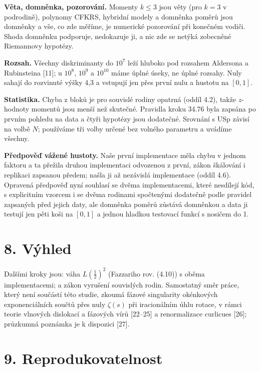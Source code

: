 \documentclass[
  10pt,
]{article}
\begin{document}
\textbf{Věta, domněnka, pozorování.} Momenty \(k \le 3\) jsou věty (pro
\(k = 3\) v podrodině), polynomy CFKRS, hybridní modely a domněnka
poměrů jsou domněnky a vše, co zde měříme, je numerické pozorování při
konečném vodiči. Shoda domněnku podporuje, nedokazuje ji, a nic zde se
netýká zobecněné Riemannovy hypotézy.

\textbf{Rozsah.} Všechny diskriminanty do \(10^7\) leží hluboko pod
rozsahem Aldersona a Rubinsteina {[}11{]}; u \(10^8\), \(10^9\) a
\(10^{10}\) máme úplné úseky, ne úplné rozsahy. Nuly sahají do rozvinuté
výšky 4,3 a vstupují jen přes první nulu a hustotu na \([0, 1]\).

\textbf{Statistika.} Chyba z bloků je pro souvislé rodiny opatrná (oddíl
4.2), takže \(z\)-hodnoty momentů jsou menší než skutečné. Pravidla
kroku 34.76 byla zapsána po prvním pohledu na data a čtyři hypotézy jsou
dodatečné. Srovnání s USp závisí na volbě \(N\); používáme tři volby
určené bez volného parametru a uvádíme všechny.

\textbf{Předpověď vážené hustoty.} Naše první implementace měla chybu v
jednom faktoru a ta přežila druhou implementaci odvozenou z první, zákon
škálování i replikaci zapsanou předem; našla ji až nezávislá
implementace (oddíl 4.6). Opravená předpověď nyní souhlasí se dvěma
implementacemi, které nesdílejí kód, s explicitním vzorcem i se dvěma
rodinami spočtenými dodatečně podle pravidel zapsaných před jejich daty,
ale domněnka poměrů zůstává domněnkou a data ji testují jen pěti koši na
\([0, 1]\) a jednou hladkou testovací funkcí s nosičem do 1.

\hypertarget{vuxfdhled}{%
\section{8. Výhled}\label{vuxfdhled}}

Dalšími kroky jsou: váha \(L(\tfrac12)^2\) (Fazzariho rov. (4.10)) s
oběma implementacemi; a zákon vyrušení souvislých rodin. Samostatný směr
práce, který není součástí této studie, zkoumá fázové singularity
okénkových exponenciálních součtů přes nuly \(\zeta(s)\) při
iracionálním úhlu rotace, v rámci teorie vlnových dislokací a fázových
vírů {[}22--25{]} a renormalizace curlicues {[}26{]}; průzkumná poznámka
je k dispozici {[}27{]}.

\hypertarget{reprodukovatelnost}{%
\section{9. Reprodukovatelnost}\label{reprodukovatelnost}}
\end{document}
